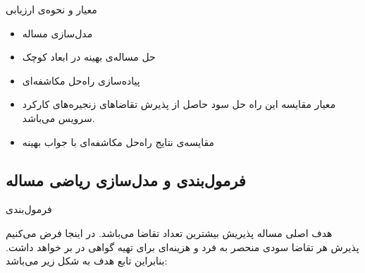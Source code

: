 \documentclass{beamer}
\makeatletter
\newcommand{\RTList}{\raggedleft\rightskip\@totalleftmargin}
\makeatother
\begin{document}
\begin{persian}
\begin{frame}{معیار و نحوه‌ی ارزیابی}
    \begin{itemize}\RTList{}
        \item مدل‌سازی مساله
        \item حل مساله‌ی بهینه در ابعاد کوچک
        \item پیاده‌سازی راه‌حل مکاشفه‌ای
        \item معیار مقایسه این راه حل سود حاصل از پذیرش تقاضاهای زنجیره‌های کارکرد سرویس می‌باشد.
        \item مقایسه‌ی نتایج راه‌حل مکاشفه‌ای با جواب بهینه
    \end{itemize}
\end{frame}
\begin{frame}{}
    \section{فرمول‌بندی و مدل‌سازی ریاضی مساله}
\end{frame}
\begin{frame}{فرمول‌بندی}
    \par
    هدف اصلی مساله پذیریش بیشترین تعداد تقاضا می‌باشد.
    در اینجا فرض می‌کنیم پذیرش هر تقاضا سودی منحصر به فرد و هزینه‌ای برای تهیه گواهی  در بر خواهد داشت.
    بنابراین تابع هدف به شکل زیر می‌باشد:


\end{frame}
\end{persian}
\end{document}
